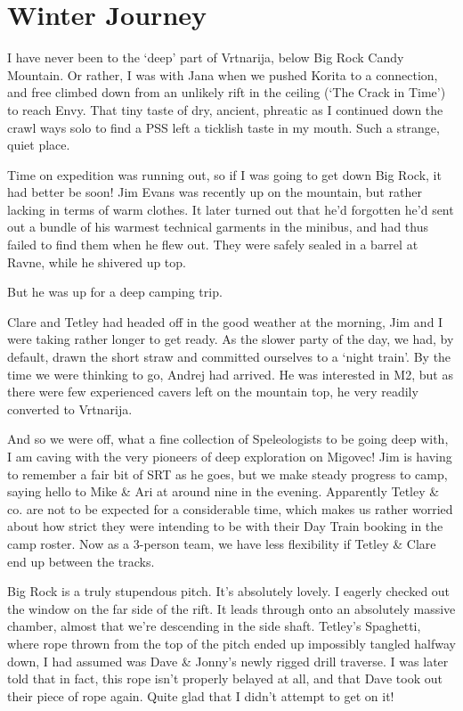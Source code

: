 
\section{Winter Journey}\label{winter-journey}

I have never been to the `deep' part of Vrtnarija, below Big Rock Candy
Mountain. Or rather, I was with Jana when we pushed Korita to a
connection, and free climbed down from an unlikely rift in the ceiling
(`The Crack in Time') to reach Envy. That tiny taste of dry, ancient,
phreatic as I continued down the crawl ways solo to find a PSS left a
ticklish taste in my mouth. Such a strange, quiet place.

Time on expedition was running out, so if I was going to get down Big
Rock, it had better be soon! Jim Evans was recently up on the mountain,
but rather lacking in terms of warm clothes. It later turned out that
he'd forgotten he'd sent out a bundle of his warmest technical garments
in the minibus, and had thus failed to find them when he flew out. They
were safely sealed in a barrel at Ravne, while he shivered up top.

But he was up for a deep camping trip.

Clare and Tetley had headed off in the good weather at the morning, Jim
and I were taking rather longer to get ready. As the slower party of the
day, we had, by default, drawn the short straw and committed ourselves
to a `night train'. By the time we were thinking to go, Andrej had
arrived. He was interested in M2, but as there were few experienced
cavers left on the mountain top, he very readily converted to Vrtnarija.

And so we were off, what a fine collection of Speleologists to be going
deep with, I am caving with the very pioneers of deep exploration on
Migovec! Jim is having to remember a fair bit of SRT as he goes, but we
make steady progress to camp, saying hello to Mike \& Ari at around nine
in the evening. Apparently Tetley \& co. are not to be expected for a
considerable time, which makes us rather worried about how strict they
were intending to be with their Day Train booking in the camp roster.
Now as a 3-person team, we have less flexibility if Tetley \& Clare end
up between the tracks.

Big Rock is a truly stupendous pitch. It's absolutely lovely. I eagerly
checked out the window on the far side of the rift. It leads through
onto an absolutely massive chamber, almost that we're descending in the
side shaft. Tetley's Spaghetti, where rope thrown from the top of the
pitch ended up impossibly tangled halfway down, I had assumed was Dave
\& Jonny's newly rigged drill traverse. I was later told that in fact,
this rope isn't properly belayed at all, and that Dave took out their
piece of rope again. Quite glad that I didn't attempt to get on it!

